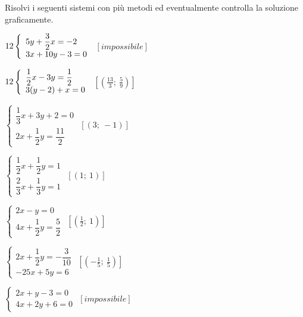 \begin{esercizio}[*]
 \label{ese:22.71}
 Risolvi i seguenti sistemi con più metodi ed eventualmente controlla
la soluzione graficamente.
\begin{htmulticols}{2}
\begin{enumeratea}
\item 
\(\arraystretch{2}\left\{\begin{array}{l}5y+\dfrac{3}{2}x=-2\\3x+10y-3=0 
\end{array}\right.\)
 \hfill \(\left[impossibile\right]\)
\item 
\(\arraystretch{2}
\left\{\begin{array}{l}\dfrac{1}{2}x-3y=\dfrac{1}{2}\\
3(y-2)+x=0 \end{array}\right.\)
 \hfill \(\left[\left(\frac{13}{3};~\frac{5}{9}\right)\right]\)
\item 
\(\left\{\begin{array}{l}{\dfrac{1}{3}x+3y+2=0}\\
{2x+\dfrac{1}{2}y=\dfrac{11}{2}}
\end{array}\right.\)
 \hfill \(\left[(3;~-1)\right]\)
\item 
\(\left\{\begin{array}{l}{\dfrac{1}{2}x+\dfrac{1}{2}y=1}\\
{\dfrac{2}{3}x+\dfrac{1}{3}y=1}\end{array}\right.\)
 \hfill \(\left[(1;~1)\right]\)
 {
\item 
\(\left\{\begin{array}{l}
{2x-y=0}\\
{4x+\dfrac{1}{2}y=\dfrac{5}{2}}\end{array}\right.\)
 \hfill \(\left[\left(\frac{1}{2};~1\right)\right]\)
\item \(\left\{\begin{array}{l}
{2x+\dfrac{1}{2}y=-\dfrac{3}{10}}\\
{-25x+5y=6}\end{array}\right.\)
 \hfill \(\left[\left(-{\frac{1}{5}};~\frac{1}{5}\right)\right]\)
\item \(\left\{\begin{array}{l}
{2x+y-3=0}\\
{4x+2y+6=0}\end{array}\right.\)
 \hfill \(\left[impossibile\right]\)
}
\end{enumeratea}
\end{htmulticols}
\end{esercizio}
